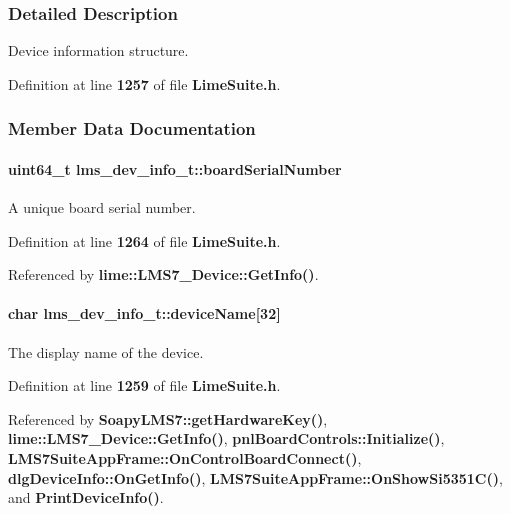 \subsubsection{Detailed Description}
Device information structure. 

Definition at line {\bf 1257} of file {\bf Lime\+Suite.\+h}.



\subsubsection{Member Data Documentation}
\paragraph[{board\+Serial\+Number}]{\setlength{\rightskip}{0pt plus 5cm}uint64\+\_\+t lms\+\_\+dev\+\_\+info\+\_\+t\+::board\+Serial\+Number}\label{structlms__dev__info__t_aad3ed39976ec74a0bc189dbae31afd2e}


A unique board serial number. 



Definition at line {\bf 1264} of file {\bf Lime\+Suite.\+h}.



Referenced by {\bf lime\+::\+L\+M\+S7\+\_\+\+Device\+::\+Get\+Info()}.

\paragraph[{device\+Name}]{\setlength{\rightskip}{0pt plus 5cm}char lms\+\_\+dev\+\_\+info\+\_\+t\+::device\+Name[32]}\label{structlms__dev__info__t_a59ee4a414162ec74cd3816d2245353f7}


The display name of the device. 



Definition at line {\bf 1259} of file {\bf Lime\+Suite.\+h}.



Referenced by {\bf Soapy\+L\+M\+S7\+::get\+Hardware\+Key()}, {\bf lime\+::\+L\+M\+S7\+\_\+\+Device\+::\+Get\+Info()}, {\bf pnl\+Board\+Controls\+::\+Initialize()}, {\bf L\+M\+S7\+Suite\+App\+Frame\+::\+On\+Control\+Board\+Connect()}, {\bf dlg\+Device\+Info\+::\+On\+Get\+Info()}, {\bf L\+M\+S7\+Suite\+App\+Frame\+::\+On\+Show\+Si5351\+C()}, and {\bf Print\+Device\+Info()}.

